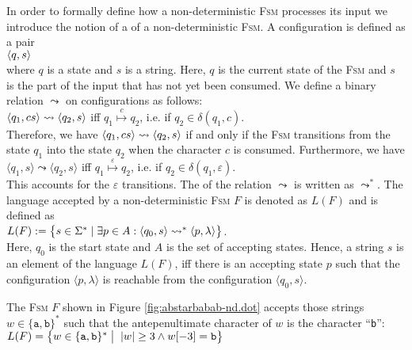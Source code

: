 In order to formally define how a non-deterministic \textsc{Fsm} processes its input we introduce the notion of a
  of a non-deterministic \textsc{Fsm}.  A configuration
is defined as a pair
\\[0.2cm]
\hspace*{1.3cm}
$\pair(q, s)$
\\[0.2cm]
where  $q$ is a state and $s$ is a  string.  Here, $q$ is the current state of
the \textsc{Fsm} and $s$ is the part of the input that has not yet been
consumed.  We define a binary relation
$\leadsto$ \index{$\leadsto$} on configurations as follows:
\\[0.2cm]
\hspace*{1.3cm}
$\pair(q_1, cs) \leadsto \pair(q_2, s)$ \quad iff \quad $q_1 \stackrel{c}{\mapsto} q_2$, \quad i.e. if $q_2 \in\delta(q_1, c)$.
\\[0.2cm]
Therefore, we have $\pair(q_1,cs) \leadsto \pair(q_2, s)$ if and only
if the \textsc{Fsm} transitions from the state
$q_1$ into the state $q_2$ when the character $c$ is consumed.
Furthermore, we have
\\[0.2cm]
\hspace*{1.3cm}
$\langle q_1, s \rangle \leadsto \langle q_2, s \rangle$ \quad iff \quad $q_1 \stackrel{\varepsilon}{\mapsto}
q_2$, \quad i.e. if $q_2 \in \delta(q_1, \varepsilon)$.
\\[0.2cm]
This accounts for the $\varepsilon$ transitions.  The
 of the relation $\leadsto$ is written as $\leadsto^*$.
The language accepted by a non-deterministic \textsc{Fsm} $F$ is
denoted as $L(F)$ and is defined as
\\[0.2cm]
\hspace*{1.3cm}
$L(F) := \bigl\{ s \in \Sigma^* \mid  
                 \exists p \in A : \pair(q_0,s) \leadsto^* \pair(p,\lambda) \bigr\}$.
\\[0.2cm]
Here,  $q_0$ is the  start state and $A$ is the set of accepting
states.  Hence, a string  $s$ is an element of the language  $L(F)$,  
iff there is an accepting state $p$ such that the configuration $\langle p, \lambda \rangle$ is reachable from the configuration $\langle q_0, s \rangle$.

\exampleEng 
The \textsc{Fsm} $F$ shown in Figure \ref{fig:abstarbabab-nd.dot} accepts
those strings $w \in \{ \mathtt{a}, \mathtt{b} \}^*$ such that the
antepenultimate character of $w$ is  the character ``\texttt{b}'':
\\[0.2cm]
\hspace*{1.3cm}
$L(F) = \bigl\{ w \in \{ \mathtt{a}, \mathtt{b} \}^* \bigm|\; |w| \geq 3 \wedge w[-3] = \mathtt{b} \bigr\}$
 \eox
\vspace*{0.3cm}

